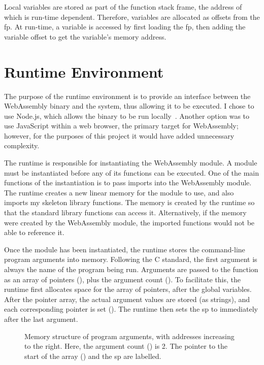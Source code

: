 \documentclass[00-main.tex]{subfiles}
\begin{document}
Local variables are stored as part of the function stack frame, the address of which is run-time dependent.
Therefore, variables are allocated as offsets from the \gls{fp}.
At run-time, a variable is accessed by first loading the \gls{fp}, then adding the variable offset to get the variable's memory address.

\section{Runtime Environment}\label{sec:impl:runtime}

The purpose of the runtime environment is to provide an interface between the WebAssembly binary and the system, thus allowing it to be executed.
I chose to use Node.js, which allows the binary to be run locally~.
Another option was to use JavaScript within a web browser, the primary target for WebAssembly; however, for the purposes of this project it would have added unnecessary complexity.

The runtime is responsible for instantiating the WebAssembly module.
A module must be instantiated before any of its functions can be executed.
One of the main functions of the instantiation is to pass imports into the WebAssembly module.
The runtime creates a new linear memory for the module to use, and also imports my skeleton library functions.
The memory is created by the runtime so that the standard library functions can access it.
Alternatively, if the memory were created by the WebAssembly module, the imported functions would not be able to reference it.

Once the module has been instantiated, the runtime stores the command-line program arguments into memory.
Following the C standard, the first argument is always the name of the program being run.
Arguments are passed to the  function as an array of  pointers (), plus the argument count ().
To facilitate this, the runtime first allocates space for the array of pointers, after the global variables.
After the pointer array, the actual argument values are stored (as strings), and each corresponding pointer is set ().
The runtime then sets the \gls{sp} to immediately after the last argument.

\begin{figure}[t]
  \centering
  \caption{\protect{}%
    Memory structure of program arguments, with addresses increasing to the right. Here, the argument count () is 2.
    The pointer to the start of the array () and the \gls{sp} are labelled.
  }%
  \label{fig:program args memory structure}
\end{figure}
\end{document}
